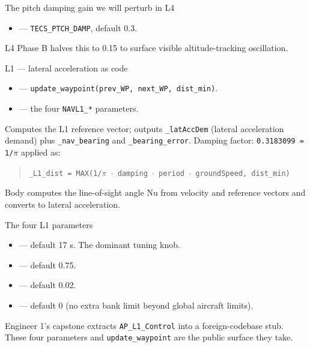 \documentclass[aspectratio=169,11pt]{beamer}
\begin{document}
\begin{frame}{The pitch damping gain we will perturb in L4}
  \begin{itemize}
    \item {} --- \texttt{TECS\_PTCH\_DAMP}, default 0.3.
  \end{itemize}
  \vfill
  L4 Phase B halves this to 0.15 to surface visible altitude-tracking oscillation.
\end{frame}

\begin{frame}{L1 --- lateral acceleration as code}
  \begin{itemize}
    \item {} --- \texttt{update\_waypoint(prev\_WP, next\_WP, dist\_min)}.
    \item {} --- the four \texttt{NAVL1\_*} parameters.
  \end{itemize}
  \vfill
  Computes the L1 reference vector; outputs \texttt{\_latAccDem} (lateral acceleration demand) plus \texttt{\_nav\_bearing} and \texttt{\_bearing\_error}.
  \vfill
  Damping factor: \texttt{0.3183099 = 1/$\pi$} applied as:
  \begin{quote}
    \texttt{\_L1\_dist = MAX(1/$\pi$ $\cdot$ damping $\cdot$ period $\cdot$ groundSpeed, dist\_min)}
  \end{quote}
  \vfill
  Body computes the line-of-sight angle Nu from velocity and reference vectors and converts to lateral acceleration.
\end{frame}

\begin{frame}{The four L1 parameters}
  \begin{itemize}
    \item {} --- default 17 s. The dominant tuning knob.
    \item {} --- default 0.75.
    \item {} --- default 0.02.
    \item {} --- default 0 (no extra bank limit beyond global aircraft limits).
  \end{itemize}
  \vfill
  Engineer 1's capstone extracts \texttt{AP\_L1\_Control} into a foreign-codebase stub. These four parameters and \texttt{update\_waypoint} are the public surface they take.
\end{frame}
\end{document}
